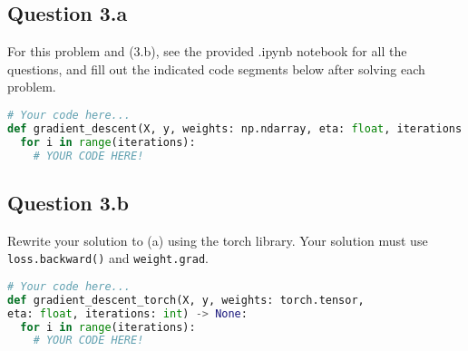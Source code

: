 \documentclass[12pt]{article}
\begin{document}
\subsection*{Question 3.a } 
For this problem and (3.b), see the provided .ipynb notebook for all the questions, and fill out the indicated code segments below after solving 
each problem.

\begin{solution}
\begin{lstlisting}[language=Python]
# Your code here...
def gradient_descent(X, y, weights: np.ndarray, eta: float, iterations: int) -> None:
  for i in range(iterations):
    # YOUR CODE HERE!
\end{lstlisting}
\end{solution}

\subsection*{Question 3.b } 
Rewrite your solution to (a) using the torch library. Your solution must use \texttt{loss.backward()} and \texttt{weight.grad}.

\begin{solution}
\begin{lstlisting}[language=Python]
# Your code here...
def gradient_descent_torch(X, y, weights: torch.tensor, 
eta: float, iterations: int) -> None:
  for i in range(iterations):
    # YOUR CODE HERE!
\end{lstlisting}
\end{solution}

\newpage
\end{document}
